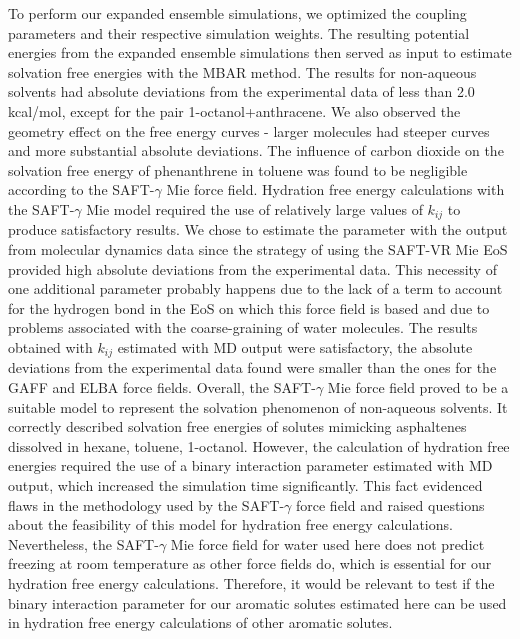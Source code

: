 \documentclass[final,12p,times,twocolumn]{elsarticle}
\begin{document}
	To perform our expanded ensemble simulations, we optimized the coupling parameters and their respective simulation weights. The resulting potential energies from the expanded ensemble simulations then served as input to estimate solvation free energies with the MBAR method. The results for non-aqueous solvents had absolute deviations from the experimental data of less than 2.0 kcal/mol, except for the pair 1-octanol+anthracene. We also observed the geometry effect on the free energy curves - larger molecules had steeper curves and more substantial absolute deviations. The influence of carbon dioxide on the solvation free energy of phenanthrene in toluene was found to be negligible according to the SAFT-$\gamma$ Mie force field. Hydration free energy calculations with the SAFT-$\gamma$ Mie model required the use of relatively large values of $k_{ij}$ to produce satisfactory results. We chose to estimate the parameter with the output from molecular dynamics data since the strategy of using the SAFT-VR Mie EoS provided high absolute deviations from the experimental data. This necessity of one additional parameter probably happens due to the lack of a term to account for the hydrogen bond in the EoS on which this force field is based and due to problems associated with the coarse-graining of water molecules. The results obtained with $k_{ij}$ estimated with MD output were satisfactory, the absolute deviations from the experimental data found were smaller than the ones for the GAFF and ELBA force fields.
	Overall, the SAFT-$\gamma$ Mie force field proved to be a suitable model to represent the solvation phenomenon of non-aqueous solvents. It correctly described solvation free energies of solutes mimicking asphaltenes dissolved in hexane, toluene, 1-octanol. However, the calculation of hydration free energies required the use of a binary interaction parameter estimated with MD output, which increased the simulation time significantly. This fact evidenced flaws in the methodology used by the SAFT-$\gamma$ force field and raised questions about the feasibility of this model for hydration free energy calculations. Nevertheless, the SAFT-$\gamma$ Mie force field for water used here does not predict freezing at room temperature as other force fields do, which is essential for our hydration free energy calculations.  Therefore, it would be relevant to test if the binary interaction parameter for our aromatic solutes estimated here can be used in hydration free energy calculations of other aromatic solutes.
	
	
	
\end{document}
